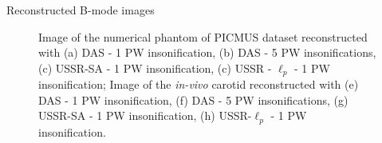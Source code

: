 {\begin{block}{Reconstructed B-mode images}
\begin{figure}[htb]
	\hfill\null%
	\caption{Image of the numerical phantom of PICMUS dataset reconstructed with (a) DAS - 1 PW insonification, (b) DAS - 5 PW insonifications, (c) USSR-SA - 1 PW insonification, (c) USSR - $\ell_p$ - 1 PW insonification; Image of the \textit{in-vivo} carotid reconstructed with (e) DAS - 1 PW insonification, (f) DAS - 5 PW insonifications, (g) USSR-SA - 1 PW insonification, (h) USSR-$\ell_p$ - 1 PW insonification.}
	\label{fig_Bmode}
\end{figure}
\end{block}
\vfill

}
